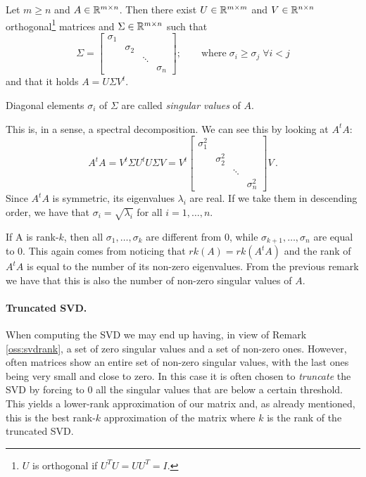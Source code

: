 \begin{Teo} \label{teo:svd}
  Let $m \geq n$ and $A \in \mathbb{R}^{m \times n}$. Then there exist $U \in \mathbb{R}^{m \times m}$ and $V \in \mathbb{R}^{n \times n}$ orthogonal\footnote{$U$ is orthogonal if $U^TU = UU^T = I$.} matrices and $\Sigma \in \mathbb{R}^{m \times n}$ such that
  \[
  \Sigma =
  \begin{bmatrix}
    \sigma_1 &&&\\
    & \sigma_2 &&\\
    && \ddots &\\
    &&& \sigma_n
  \end{bmatrix}
  ; \qquad \text{where} \; \sigma_i \geq \sigma_j \; \forall i < j
  \]
  and that it holds $A = U \Sigma V^t$.
\end{Teo}
Diagonal elements $\sigma_i$ of $\Sigma$ are called \emph{singular values} of $A$.
\begin{Oss}
  This is, in a sense, a spectral decomposition. We can see this by looking at $A^t A$:
  \begin{equation*}
  A^t A = V^t \Sigma U^t U \Sigma V = V^t
  \begin{bmatrix}
    \sigma_1^2 &&&\\
    & \sigma_2^2 &&\\
    && \ddots &\\
    &&& \sigma_n^2
  \end{bmatrix}
  V\, .
  \end{equation*}
  Since $A^t A$ is symmetric, its eigenvalues $\lambda_i$ are real. If we take them in descending order, we have that $\sigma_i = \sqrt{\lambda_i}$ for all $i = 1, \ldots, n$.
\end{Oss}
\begin{Oss} \label{oss:svdrank}
  If A is rank-$k$, then all $\sigma_1, \ldots, \sigma_k$ are different from $0$, while $\sigma_{k+1}, \ldots, \sigma_n$ are equal to $0$. This again comes from noticing that $rk(A) = rk(A^t A)$ and the rank of $A^t A$ is equal to the number of its non-zero eigenvalues. From the previous remark we have that this is also the number of non-zero singular values of $A$.
\end{Oss}

\paragraph{Truncated SVD.}
When computing the SVD we may end up having, in view of Remark \ref{oss:svdrank}, a set of zero singular values and a set of non-zero ones. However, often matrices show an entire set of non-zero singular values, with the last ones being very small and close to zero.
In this case it is often chosen to \emph{truncate} the SVD by forcing to $0$ all the singular values that are below a certain threshold. This yields a lower-rank approximation of our matrix and, as already mentioned, this is the best rank-$k$ approximation of the matrix where $k$ is the rank of the truncated SVD.

